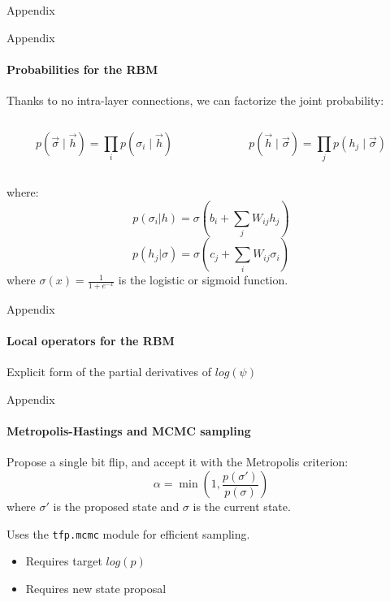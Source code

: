 \documentclass{beamer}
\begin{document}
\backmatter

\appendix


\begin{chapter}{}{Appendix}
\end{chapter}

\begin{frame}{Appendix}
\framesubtitle{Probabilities for the RBM}

Thanks to no intra-layer connections, we can factorize the joint probability:

\begin{columns}[t]
	\begin{column}{0.48\textwidth}
		$$ p(\vec{\sigma} \mid \vec{h}) = \prod_{i} p(\sigma_i \mid \vec{h}) $$
	\end{column}
	\begin{column}{0.48\textwidth}
		$$ p(\vec{h} \mid \vec{\sigma}) = \prod_{j} p(h_j \mid \vec{\sigma}) $$
	\end{column}
\end{columns}
where:
$$ p(\sigma_i | h) = \sigma\left(b_i + \sum_{j} W_{ij} h_j\right) $$
$$ p(h_j | \sigma) = \sigma\left(c_j + \sum_{i} W_{ij} \sigma_i\right) $$
where $\sigma(x) = \frac{1}{1 + e^{-x}}$ is the logistic or sigmoid function.

\end{frame}

\begin{frame}{Appendix}
\framesubtitle{Local operators for the RBM}
Explicit form of the partial derivatives of $log\left(\psi\right)$


\end{frame}

\begin{frame}[fragile]{Appendix}
\framesubtitle{Metropolis-Hastings and MCMC sampling}
Propose a single bit flip, and accept it with the Metropolis criterion:
$$\alpha = \min\left(1, \frac{p(\sigma')}{p(\sigma)}\right)$$
where $\sigma'$ is the proposed state and $\sigma$ is the current state.
\baselineskip

Uses the \lstinline[style=kaolstplain]|tfp.mcmc| module for efficient sampling.
\begin{itemize}
	\item Requires target $log(p)$
	\item Requires new state proposal
\end{itemize}

\end{frame}
\end{document}
